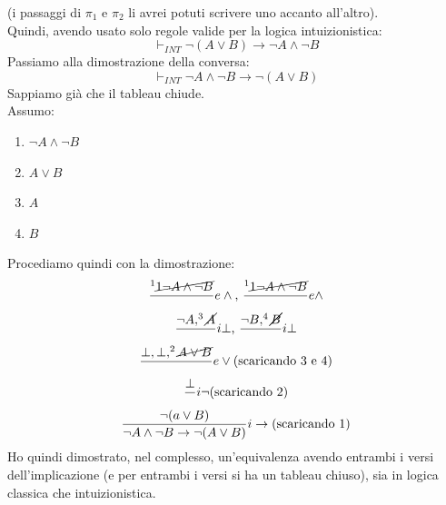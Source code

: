 \documentclass[a4paper,12pt, oneside]{book}
\begin{document}
\begin{esempio}
  (i passaggi di $\pi_1$ e $\pi_2$ li avrei potuti scrivere uno accanto
  all'altro). \\
  Quindi, avendo usato solo regole valide per la logica intuizionistica:
  \[\vdash_{INT}\neg(A\lor B)\to \neg A\land \neg B\]
  Passiamo alla dimostrazione della conversa:
 \[\vdash_{INT}\neg A\land \neg B\to\neg(A\lor B)\]
 Sappiamo già che il tableau chiude.\\
 Assumo:
 \begin{enumerate}
   \item $\neg A\land \neg B$
   \item $A\lor B$
   \item $A$
   \item $B$
 \end{enumerate}
 Procediamo quindi con la dimostrazione:
 \begin{gather*}
   \frac{^1\cancel{1\neg A\land \neg B}}{}e\land\mbox{, }\frac{^1\cancel{1\neg
         A\land \neg B}}{}e\land\\ 
   \frac{\neg A, ^3 \cancel{A}}{}i\bot\mbox{, }\frac{\neg B,
     ^4\cancel{B}}{}i\bot\\  
   \frac{\bot,\bot,^2\cancel{A\lor B}}{}e\lor\mbox{(scaricando 3 e 4)}\\
   \frac{\bot}{}i\neg\mbox{(scaricando 2)}\\
   \frac{\neg(a\lor B)}{\neg A\land \neg B\to\neg(A\lor B)}i\to\mbox{(scaricando
     1)} 
 \end{gather*}
 Ho quindi dimostrato, nel complesso, un'equivalenza avendo entrambi i versi
 dell'implicazione (e per entrambi i versi si ha un tableau chiuso), sia in
 logica classica che intuizionistica.  
\end{esempio}
\end{document}
